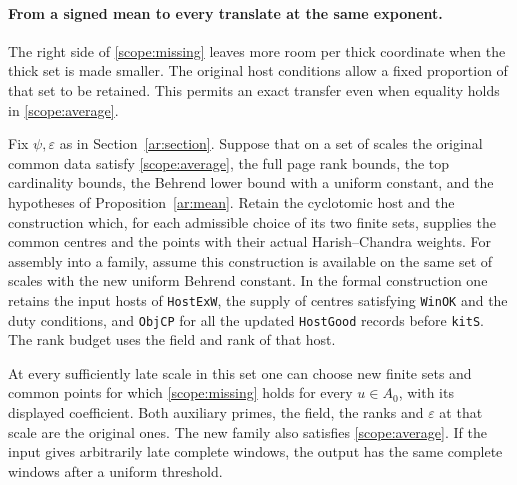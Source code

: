 \paragraph{From a signed mean to every translate at the same exponent.}
The right side of \eqref{scope:missing} leaves more room per thick
coordinate when the thick set is made smaller. The original host conditions
allow a fixed proportion of that set to be retained. This permits an exact
transfer even when equality holds in \eqref{scope:average}.

\begin{proposition}\label{scope:reselection}
Fix \(\psi,\varepsilon\) as in Section~\ref{ar:section}. Suppose that on a
set of scales the original common data satisfy \eqref{scope:average},
the full page rank bounds, the top cardinality bounds, the Behrend lower
bound with a uniform constant, and the hypotheses of
Proposition~\ref{ar:mean}. Retain the cyclotomic host and the construction
which, for each admissible choice of its two finite sets, supplies the
common centres and the points with their actual Harish--Chandra weights.
For assembly into a family, assume this construction is available on the
same set of scales with the new uniform Behrend constant. In the formal
construction one retains the input hosts of \texttt{HostExW}, the supply
of centres satisfying \texttt{WinOK} and the duty conditions, and
\texttt{ObjCP} for all the updated \texttt{HostGood} records before
\texttt{kitS}. The rank budget uses the field and rank of that host.

At every sufficiently late scale in this set one can choose new finite
sets and common points for which \eqref{scope:missing} holds for every
\(u\in A_0\), with its displayed coefficient. Both auxiliary primes,
the field, the ranks and \(\varepsilon\) at that scale are the original
ones. The new family also satisfies \eqref{scope:average}. If the
input gives arbitrarily late complete windows, the output has the
same complete windows after a uniform threshold.
\end{proposition}

